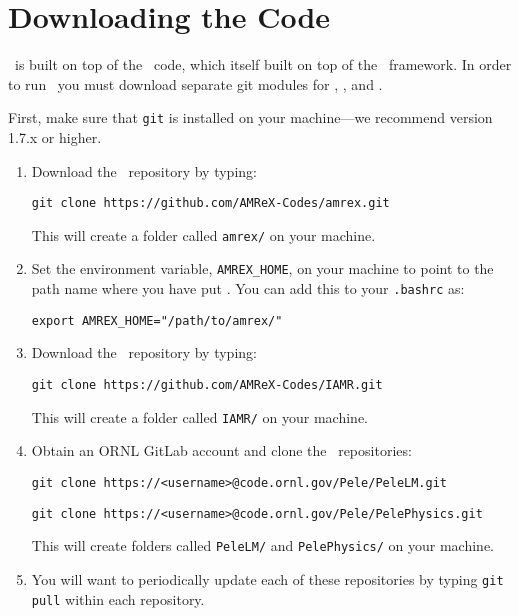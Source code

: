 
\section{Downloading the Code}

\pelelm\ is built on top of the \iamr\ code, which itself built on top of the \amrex\ framework.  In order to run
\pelelm\, you must download separate git modules for \pelelm, \iamr, and \amrex.

\vspace{.1in}

\noindent First, make sure that {\tt git} is installed on your machine---we recommend version 1.7.x or higher.

\vspace{.1in}

\begin{enumerate}

\item Download the \amrex\ repository by typing: 
\begin{verbatim}
git clone https://github.com/AMReX-Codes/amrex.git
\end{verbatim}

This will create a folder called {\tt amrex/} on your machine.

\item Set the environment variable, {\tt AMREX\_HOME}, on your
  machine to point to the path name where you have put \amrex.
  You can add this to your {\tt .bashrc} as:
\begin{verbatim}
export AMREX_HOME="/path/to/amrex/"
\end{verbatim}

\item Download the \iamr\ repository by typing: 
\begin{verbatim}
git clone https://github.com/AMReX-Codes/IAMR.git
\end{verbatim}

This will create a folder called {\tt IAMR/} on your machine.

\item Obtain an ORNL GitLab account and clone the \pele\ repositories:
\begin{verbatim}
git clone https://<username>@code.ornl.gov/Pele/PeleLM.git
\end{verbatim}
\begin{verbatim}
git clone https://<username>@code.ornl.gov/Pele/PelePhysics.git
\end{verbatim}

This will create folders called {\tt PeleLM/} and {\tt PelePhysics/} on your machine.

\item You will want to periodically update each of these repositories
by typing {\tt git pull} within each repository.

\end{enumerate}

